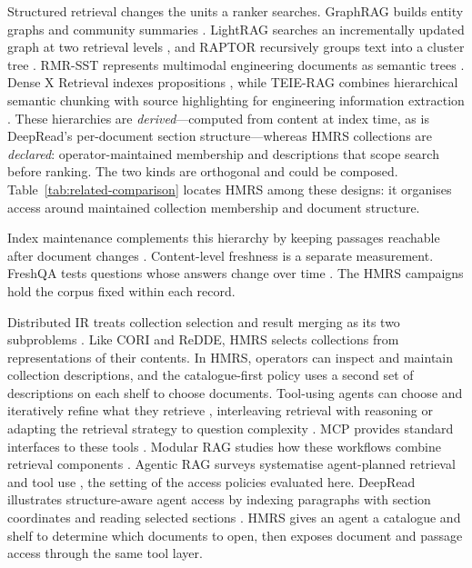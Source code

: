 Structured retrieval changes the units a ranker searches.
GraphRAG builds entity graphs and community
summaries \citep{graphrag}. LightRAG searches an incrementally updated
graph at two retrieval levels \citep{lightrag}, and RAPTOR recursively
groups text into a cluster tree \citep{raptor}. RMR-SST represents multimodal engineering
documents as semantic trees \citep{li-kbs-rmrsst-2026}. Dense X Retrieval
indexes propositions \citep{chen2024dense}, while TEIE-RAG combines
hierarchical semantic chunking with source highlighting for engineering
information extraction \citep{shen-kbs-teierag-2026}.
These hierarchies are \emph{derived}---computed from content at index
time, as is DeepRead's per-document section structure---whereas HMRS
collections are \emph{declared}: operator-maintained membership and
descriptions that scope search before ranking. The two kinds are
orthogonal and could be composed.
Table~\ref{tab:related-comparison} locates HMRS among these designs: it
organises access around maintained collection membership and document
structure.

Index maintenance complements this hierarchy by keeping passages reachable
after document changes \citep{xu2023spfresh}. Content-level freshness is a
separate measurement. FreshQA tests questions whose answers change over
time \citep{vu-freshqa-2024}. The HMRS campaigns hold the corpus fixed
within each record.

Distributed IR treats collection selection and result merging as its two
subproblems \citep{callan1995searching,si2003redde,shokouhi-federated-2011}.
Like CORI and ReDDE, HMRS selects collections from representations of
their contents. In HMRS, operators can inspect and maintain collection
descriptions, and the catalogue-first policy uses a second set of
descriptions on each shelf to choose documents. Tool-using agents can
choose and iteratively refine what they retrieve
\citep{react-yao,toolformer}, interleaving retrieval with reasoning
\citep{ircot} or adapting the retrieval strategy to question complexity
\citep{adaptive-rag}. MCP provides standard
interfaces to these tools \citep{mcp}. Modular RAG studies how these
workflows combine retrieval components \citep{modular-rag}. Agentic RAG
surveys systematise agent-planned retrieval and tool use
\citep{singh-agentic-rag-2025}, the setting of the access policies evaluated
here. DeepRead illustrates structure-aware agent access by indexing paragraphs with section
coordinates and reading selected sections \citep{deepread}. HMRS gives
an agent a catalogue and shelf to determine which documents to open, then
exposes document and passage access through the same tool layer.

